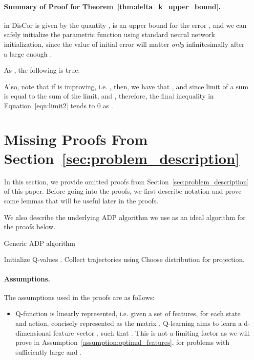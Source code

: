 \documentclass[jmlr]{article}
\begin{document}
\paragraph{Summary of Proof for Theorem~\ref{thm:delta_k_upper_bound}.}  in DisCor is given by the quantity , is an upper bound for the error , and we can safely initialize the parametric function  using standard neural network initialization, since the value of initial error will matter \textit{only} infinitesimally after a large enough . 

As , the following is true:

Also, note that if  is improving, i.e. , then, we have that , and since limit of a sum is equal to the sum of the limit, and , therefore, the final inequality in Equation~\ref{eqn:limit2} tends to 0 as .

\section{Missing Proofs From Section~\ref{sec:problem_description}}
\label{sec:omitted_proofs}
In this section, we provide omitted proofs from Section~\ref{sec:problem_description} of this paper. Before going into the proofs, we first describe notation and prove some lemmas that will be useful later in the proofs.


We also describe the underlying ADP algorithm we use as an ideal algorithm for the proofs below.

\begin{algorithm}[H]
\small
\caption{Generic ADP algorithm}
\label{alg:fqi}
\begin{algorithmic}[1]
    \STATE Initialize Q-values .
        \STATE Collect trajectories using 
        \STATE Choose distribution  for projection.
        \STATE  \\ 
    \ENDFOR
\end{algorithmic}
\end{algorithm}

\paragraph{Assumptions.} The assumptions used in the proofs are as follows:
\begin{itemize}
    \item Q-function is linearly represented, i.e. given a set of features,  for each state and action, concisely represented as the matrix , Q-learning aims to learn a d-dimensional feature vector , such that . This is not a limiting factor as we will prove in Assumption~\ref{assumption:optimal_features}, for problems with sufficiently large  and .
\end{itemize}
\end{document}
